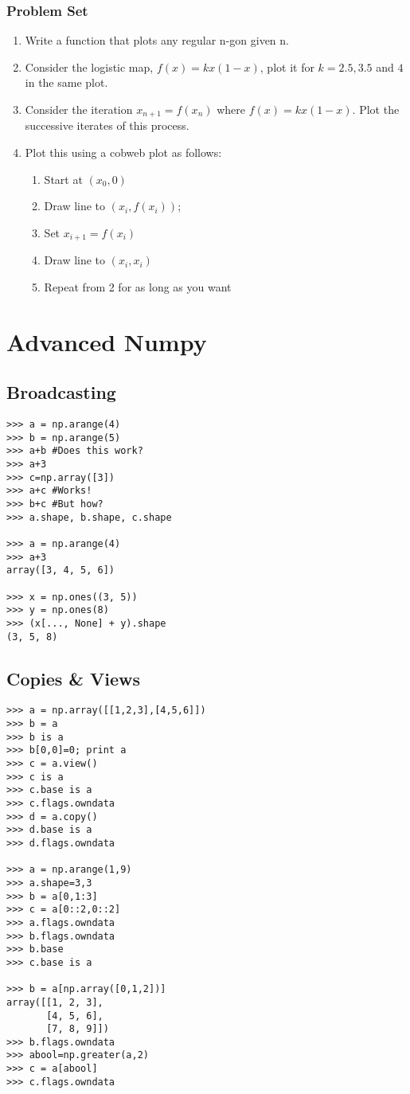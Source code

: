 \documentclass[12pt]{article}
\begin{document}
\subsubsection{Problem Set}
  \begin{enumerate}
    \item Write a function that plots any regular n-gon given n.
    \item Consider the logistic map, $f(x) = kx(1-x)$, plot it for
          $k=2.5, 3.5$ and $4$ in the same plot.

  \item Consider the iteration $x_{n+1} = f(x_n)$ where $f(x) =
        kx(1-x)$.  Plot the successive iterates of this process.
  \item Plot this using a cobweb plot as follows:
  \begin{enumerate}
    \item Start at $(x_0, 0)$
    \item Draw line to $(x_i, f(x_i))$; 
    \item Set $x_{i+1} = f(x_i)$
    \item Draw line to $(x_i, x_i)$
    \item Repeat from 2 for as long as you want 
  \end{enumerate}
\end{enumerate}

\section{Advanced Numpy}

\subsection{Broadcasting}
\begin{verbatim}
>>> a = np.arange(4)
>>> b = np.arange(5)
>>> a+b #Does this work?
>>> a+3
>>> c=np.array([3])
>>> a+c #Works!
>>> b+c #But how?
>>> a.shape, b.shape, c.shape

>>> a = np.arange(4)
>>> a+3
array([3, 4, 5, 6])

>>> x = np.ones((3, 5))
>>> y = np.ones(8)
>>> (x[..., None] + y).shape
(3, 5, 8)

\end{verbatim}

\subsection{Copies \& Views}
\begin{verbatim}
>>> a = np.array([[1,2,3],[4,5,6]])
>>> b = a
>>> b is a
>>> b[0,0]=0; print a
>>> c = a.view()
>>> c is a
>>> c.base is a
>>> c.flags.owndata
>>> d = a.copy()
>>> d.base is a
>>> d.flags.owndata

>>> a = np.arange(1,9)
>>> a.shape=3,3
>>> b = a[0,1:3]
>>> c = a[0::2,0::2]
>>> a.flags.owndata
>>> b.flags.owndata
>>> b.base
>>> c.base is a

>>> b = a[np.array([0,1,2])]
array([[1, 2, 3],
       [4, 5, 6],
       [7, 8, 9]])
>>> b.flags.owndata
>>> abool=np.greater(a,2)
>>> c = a[abool]
>>> c.flags.owndata

\end{verbatim}
\end{document}
